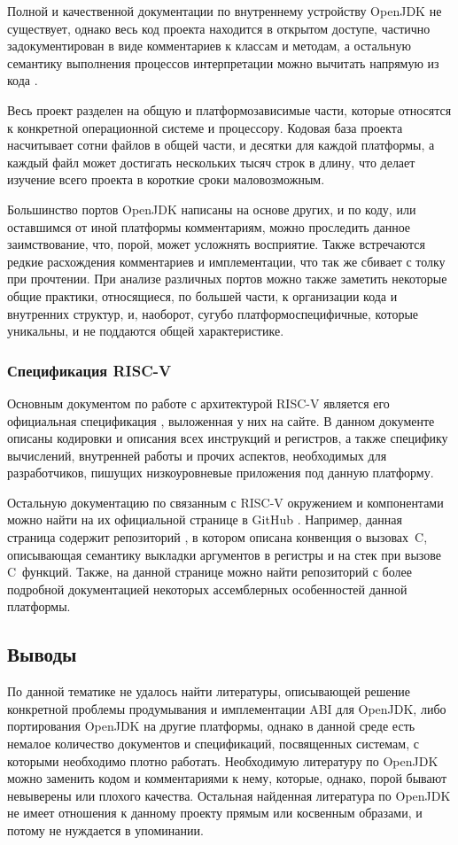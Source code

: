 Полной и качественной документации по внутреннему устройству OpenJDK не существует, однако весь код проекта находится в открытом доступе, частично задокументирован в виде комментариев к классам и методам, а остальную семантику выполнения процессов интерпретации можно вычитать напрямую из кода \cite{hotspot}.

Весь проект разделен на общую и платформозависимые части, которые относятся к конкретной операционной системе и процессору. Кодовая база проекта насчитывает сотни файлов в общей части, и десятки для каждой платформы, а каждый файл может достигать нескольких тысяч строк в длину, что делает изучение всего проекта в короткие сроки маловозможным.

Большинство портов OpenJDK написаны на основе других, и по коду, или оставшимся от иной платформы комментариям, можно проследить данное заимствование, что, порой, может усложнять восприятие. Также встречаются редкие расхождения комментариев и имплементации, что так же сбивает с толку при прочтении. При анализе различных портов можно также заметить некоторые общие практики, относящиеся, по большей части, к организации кода и внутренних структур, и, наоборот, сугубо платформоспецифичные, которые уникальны, и не поддаются общей характеристике.


\subsubsection*{Спецификация RISC-V}

Основным документом по работе с архитектурой RISC-V является его официальная спецификация \cite{riscv:spec}, выложенная у них на сайте. В данном документе описаны кодировки и описания всех инструкций и регистров, а также специфику вычислений, внутренней работы и прочих аспектов, необходимых для разработчиков, пишущих низкоуровневые приложения под данную платформу. 

Остальную документацию по связанным с RISC-V окружением и компонентами можно найти на их официальной странице в GitHub \cite{riscv:github}. Например, данная страница содержит репозиторий \cite{riscv:convention}, в котором описана конвенция о вызовах~C, описывающая семантику выкладки аргументов в регистры и на стек при вызове C~функций. Также, на данной странице можно найти репозиторий \cite{riscv:asm} с более подробной документацией некоторых ассемблерных особенностей данной платформы.


\subsection*{Выводы}

По данной тематике не удалось найти литературы, описывающей решение конкретной проблемы продумывания и имплементации ABI для OpenJDK, либо портирования OpenJDK на другие платформы, однако в данной среде есть немалое количество документов и спецификаций, посвященных системам, с которыми необходимо плотно работать. Необходимую литературу по OpenJDK можно заменить кодом и комментариями к нему, которые, однако, порой бывают невыверены или плохого качества. Остальная найденная литература по OpenJDK не имеет отношения к данному проекту прямым или косвенным образами, и потому не нуждается в упоминании.
